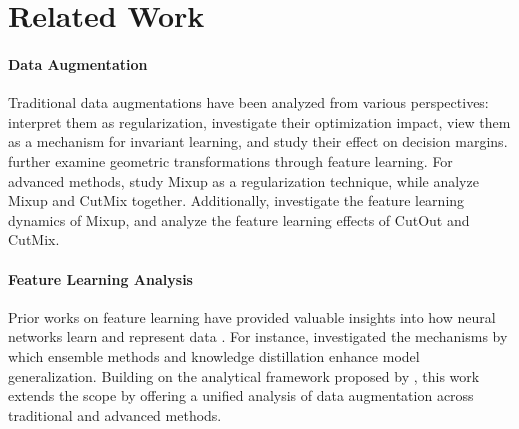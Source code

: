 \section{Related Work}
\paragraph{Data Augmentation} Traditional data augmentations have been analyzed from various perspectives: \citet{bishop1995training,dao2019kernel} interpret them as regularization, \citet{hanin2021data} investigate their optimization impact, \citet{chen2020group} view them as a mechanism for invariant learning, and \citet{rajput2019does} study their effect on decision margins. \citet{shen2022data} further examine geometric transformations through feature learning. For advanced methods, \citet{zhang2020does,carratino2022mixup} study Mixup as a regularization technique, while \citet{park2022unified} analyze Mixup and CutMix together. Additionally, \citet{chidambaram2023provably,zou2023benefits} investigate the feature learning dynamics of Mixup, and \citet{oh2024provable} analyze the feature learning effects of CutOut and CutMix.


\paragraph{Feature Learning Analysis}
Prior works on feature learning have provided valuable insights into how neural networks learn and represent data \citep{wen2021toward,wen2022mechanism,allen2022feature,allen-zhu2023towards,jelassi2022towards,huang2023understanding,chen2024does}. For instance, \citet{allen-zhu2023towards} investigated the mechanisms by which ensemble methods and knowledge distillation enhance model generalization.
Building on the analytical framework proposed by \citet{allen-zhu2023towards}, this work extends the scope by offering a unified analysis of data augmentation across traditional and advanced methods.